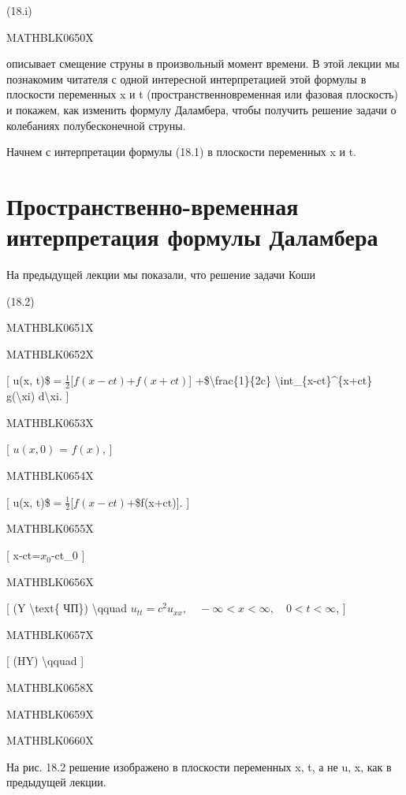 \documentclass[
]{article}
\begin{document}
{{(18.i)

MATHBLK0650X

описывает смещение струны в произвольный момент времени. В этой лекции
мы познакомим читателя с одной интересной интерпретацией этой формулы в
плоскости переменных x и t (пространственновременная или фазовая
плоскость) и покажем, как изменить формулу Даламбера, чтобы получить
решение задачи о колебаниях полубесконечной струны.

Начнем с интерпретации формулы (18.1) в плоскости переменных x и t.

\section{Пространственно-временная интерпретация формулы
Даламбера}\label{ux43fux440ux43eux441ux442ux440ux430ux43dux441ux442ux432ux435ux43dux43dux43e-ux432ux440ux435ux43cux435ux43dux43dux430ux44f-ux438ux43dux442ux435ux440ux43fux440ux435ux442ux430ux446ux438ux44f-ux444ux43eux440ux43cux443ux43bux44b-ux434ux430ux43bux430ux43cux431ux435ux440ux430}

На предыдущей лекции мы показали, что решение задачи Коши

(18.2)

MATHBLK0651X

MATHBLK0652X

{[} u(x, t)\$\(= \frac{1}{2}\){[}\(f(x-ct)\)+\(f(x+ct)\){]}
+\$\textbackslash frac\{1\}\{2c\}
\textbackslash int\_\{x-ct\}\^{}\{x+ct\} g(\textbackslash xi)
d\textbackslash xi. {]}

MATHBLK0653X

{[} \(u(x, 0)\) = \(f(x)\), {]}

MATHBLK0654X

{[} u(x, t)\$\(= \frac{1}{2}\){[}\(f(x-ct)\)+\$f(x+ct){]}. {]}

MATHBLK0655X

{[} x-ct=\(x_0\)-ct\_0 {]}

MATHBLK0656X

{[} (Y \textbackslash text\{ ЧП\}) \textbackslash qquad
\(u_{tt} = c^2 u_{xx}, \quad -\infty < x < \infty, \quad 0 < t < \infty\),
{]}

MATHBLK0657X

{[} (HY) \textbackslash qquad {]}

MATHBLK0658X

MATHBLK0659X

MATHBLK0660X

На рис. 18.2 решение изображено в плоскости переменных x, t, а не u, x,
как в предыдущей лекции.

}}
\end{document}
